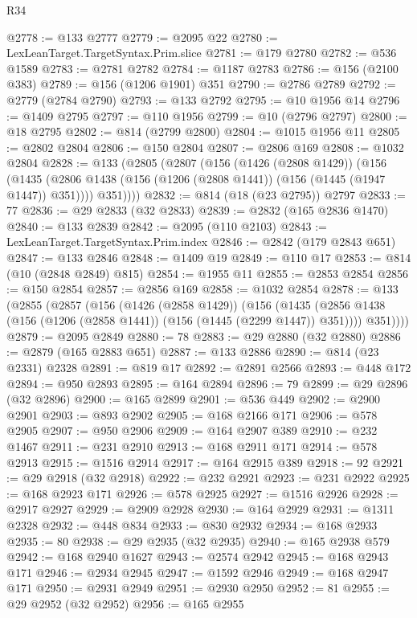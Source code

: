 \begin{lexlean}{R34}
\begin{coremodule}
@2778 := @133 @2777
@2779 := @2095 @22
@2780 := LexLeanTarget.TargetSyntax.Prim.slice
@2781 := @179 @2780
@2782 := @536 @1589
@2783 := @2781 @2782
@2784 := @1187 @2783
@2786 := @156 (@2100 @383)
@2789 := @156 (@1206 @1901) @351
@2790 := @2786 @2789
@2792 := @2779 (@2784 @2790)
@2793 := @133 @2792
@2795 := @10 @1956 @14
@2796 := @1409 @2795
@2797 := @110 @1956
@2799 := @10 (@2796 @2797)
@2800 := @18 @2795
@2802 := @814 (@2799 @2800)
@2804 := @1015 @1956 @11
@2805 := @2802 @2804
@2806 := @150 @2804
@2807 := @2806 @169
@2808 := @1032 @2804
@2828 := @133
    (@2805
      (@2807
        (@156
          (@1426 (@2808 @1429))
          (@156
            (@1435 (@2806 @1438 (@156 (@1206 (@2808 @1441)) (@156 (@1445 (@1947 @1447)) @351))))
            @351))))
@2832 := @814 (@18 (@23 @2795)) @2797
@2833 := 77
@2836 := @29 @2833 (@32 @2833)
@2839 := @2832 (@165 @2836 @1470)
@2840 := @133 @2839
@2842 := @2095 (@110 @2103)
@2843 := LexLeanTarget.TargetSyntax.Prim.index
@2846 := @2842 (@179 @2843 @651)
@2847 := @133 @2846
@2848 := @1409 @19
@2849 := @110 @17
@2853 := @814 (@10 (@2848 @2849) @815)
@2854 := @1955 @11
@2855 := @2853 @2854
@2856 := @150 @2854
@2857 := @2856 @169
@2858 := @1032 @2854
@2878 := @133
    (@2855
      (@2857
        (@156
          (@1426 (@2858 @1429))
          (@156
            (@1435 (@2856 @1438 (@156 (@1206 (@2858 @1441)) (@156 (@1445 (@2299 @1447)) @351))))
            @351))))
@2879 := @2095 @2849
@2880 := 78
@2883 := @29 @2880 (@32 @2880)
@2886 := @2879 (@165 @2883 @651)
@2887 := @133 @2886
@2890 := @814 (@23 @2331) @2328
@2891 := @819 @17
@2892 := @2891 @2566
@2893 := @448 @172
@2894 := @950 @2893
@2895 := @164 @2894
@2896 := 79
@2899 := @29 @2896 (@32 @2896)
@2900 := @165 @2899
@2901 := @536 @449
@2902 := @2900 @2901
@2903 := @893 @2902
@2905 := @168 @2166 @171
@2906 := @578 @2905
@2907 := @950 @2906
@2909 := @164 @2907 @389
@2910 := @232 @1467
@2911 := @231 @2910
@2913 := @168 @2911 @171
@2914 := @578 @2913
@2915 := @1516 @2914
@2917 := @164 @2915 @389
@2918 := 92
@2921 := @29 @2918 (@32 @2918)
@2922 := @232 @2921
@2923 := @231 @2922
@2925 := @168 @2923 @171
@2926 := @578 @2925
@2927 := @1516 @2926
@2928 := @2917 @2927
@2929 := @2909 @2928
@2930 := @164 @2929
@2931 := @1311 @2328
@2932 := @448 @834
@2933 := @830 @2932
@2934 := @168 @2933
@2935 := 80
@2938 := @29 @2935 (@32 @2935)
@2940 := @165 @2938 @579
@2942 := @168 @2940 @1627
@2943 := @2574 @2942
@2945 := @168 @2943 @171
@2946 := @2934 @2945
@2947 := @1592 @2946
@2949 := @168 @2947 @171
@2950 := @2931 @2949
@2951 := @2930 @2950
@2952 := 81
@2955 := @29 @2952 (@32 @2952)
@2956 := @165 @2955

\end{coremodule}
\end{lexlean}
